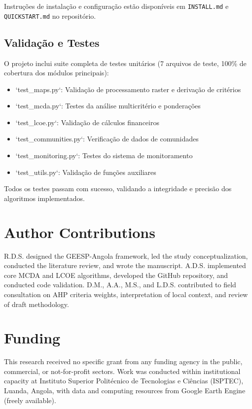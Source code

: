 \documentclass[12pt, a4paper]{article}
\begin{document}
Instruções de instalação e configuração estão disponíveis em \texttt{INSTALL.md} e \texttt{QUICKSTART.md} no repositório.

\subsection{Validação e Testes}

O projeto inclui suite completa de testes unitários (7 arquivos de teste, 100\% de cobertura dos módulos principais):

\begin{itemize}
    \item `test\_maps.py`: Validação de processamento raster e derivação de critérios
    \item `test\_mcda.py`: Testes da análise multicritério e ponderações
    \item `test\_lcoe.py`: Validação de cálculos financeiros
    \item `test\_communities.py`: Verificação de dados de comunidades
    \item `test\_monitoring.py`: Testes do sistema de monitoramento
    \item `test\_utils.py`: Validação de funções auxiliares
\end{itemize}

Todos os testes passam com sucesso, validando a integridade e precisão dos algoritmos implementados.

\section*{Author Contributions}
R.D.S. designed the GEESP-Angola framework, led the study conceptualization, conducted the literature review, and wrote the manuscript. A.D.S. implemented core MCDA and LCOE algorithms, developed the GitHub repository, and conducted code validation. D.M., A.A., M.S., and L.D.S. contributed to field consultation on AHP criteria weights, interpretation of local context, and review of draft methodology.

\section*{Funding}
This research received no specific grant from any funding agency in the public, commercial, or not-for-profit sectors. Work was conducted within institutional capacity at Instituto Superior Politécnico de Tecnologias e Ciências (ISPTEC), Luanda, Angola, with data and computing resources from Google Earth Engine (freely available).
\end{document}
